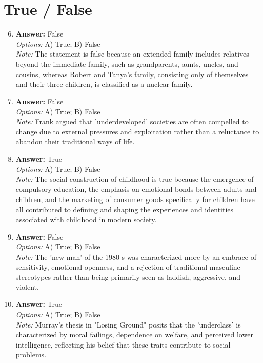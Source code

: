 \documentclass[12pt]{article}
\begin{document}
\section*{True / False}
\begin{enumerate}[label=\arabic*.]
\setcounter{enumi}{5}
\item \textbf{Answer:} False
\\ \textit{Options:} A) True; B) False
\\ \textit{Note:} The statement is false because an extended family includes relatives beyond the immediate family, such as grandparents, aunts, uncles, and cousins, whereas Robert and Tanya's family, consisting only of themselves and their three children, is classified as a nuclear family.
\item \textbf{Answer:} False
\\ \textit{Options:} A) True; B) False
\\ \textit{Note:} Frank argued that 'underdeveloped' societies are often compelled to change due to external pressures and exploitation rather than a reluctance to abandon their traditional ways of life.
\item \textbf{Answer:} True
\\ \textit{Options:} A) True; B) False
\\ \textit{Note:} The social construction of childhood is true because the emergence of compulsory education, the emphasis on emotional bonds between adults and children, and the marketing of consumer goods specifically for children have all contributed to defining and shaping the experiences and identities associated with childhood in modern society.
\item \textbf{Answer:} False
\\ \textit{Options:} A) True; B) False
\\ \textit{Note:} The 'new man' of the 1980 s was characterized more by an embrace of sensitivity, emotional openness, and a rejection of traditional masculine stereotypes rather than being primarily seen as laddish, aggressive, and violent.
\item \textbf{Answer:} True
\\ \textit{Options:} A) True; B) False
\\ \textit{Note:} Murray's thesis in "Losing Ground" posits that the 'underclass' is characterized by moral failings, dependence on welfare, and perceived lower intelligence, reflecting his belief that these traits contribute to social problems.
\end{enumerate}
\end{document}
